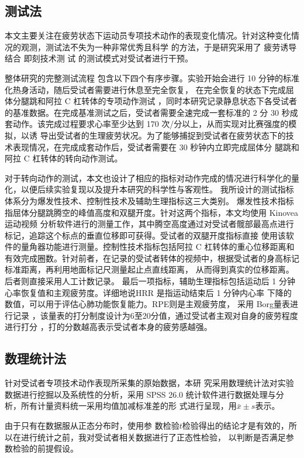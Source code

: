\documentclass[a4paper,12pt]{article}
\begin{document}
\subsection{测试法}

本文主要关注在疲劳状态下运动员专项技术动作的表现变化情况。针对这种变化情况的观测，测试法不失为一种非常优秀且科学
的方法，于是研究采用了 疲劳诱导 结合 即刻技术测
试 的测试模式对受试者进行干预。

整体研究的完整测试流程
包含以下四个有序步骤。实验开始会进行 10 分钟的标准化热身活动，随后受试者需要进行休息至完全恢复，
在完全恢复的状态下完成屈体分腿跳和阿拉 C 杠转体的专项动作测试
，同时本研究记录静息状态下各受试者的基准数据。在完成基准测试之后，受试者需要全速完成一套标准的
2 分 30 秒成套动作。该完成过程要求心率至少达到 170 次/分以上，从而实现对比赛强度的模拟，以诱
导出受试者的生理疲劳状况。为了能够捕捉到受试者在疲劳状态下的技术表现情况，在完成成套动作后，受试者需要在 30 秒钟内立即完成屈体分
腿跳和阿拉 C 杠转体的转向动作测试。

对于转向动作的测试，本文也设计了相应的指标对动作完成的情况进行科学化的量化，以便后续实验复现以及提升本研究的科学性与客观性。
我所设计的测试指标体系分为爆发性技术、控制性技术及辅助生理指标这三大类别。
爆发性技术指标指屈体分腿跳腾空的峰值高度和双腿开度。针对这两个指标，本文均使用 Kinovea 运动视频
分析软件进行的测量工作，其中腾空高度通过对受试者髋部最高点进行标记，追踪这个标点的垂直位移即可获得。受试者的双腿开度指标直接
使用该软件的量角器功能进行测量。控制性技术指标包括阿拉 C 杠转体的重心位移距离和
有效完成圈数。针对前者，在记录的受试者转体的视频中，根据受试者的身高标记标准距离，再利用地面标记尺测量起止点直线距离，
从而得到真实的位移距离。
后者则直接采用人工计数记录。
最后一项指标，辅助生理指标包括运动后 1 分钟心率恢复值和主观疲劳度。详细地说HRR 是指运动结束后 1 分钟内心率
下降的数值，可以用于评估心肺功能恢复能力。RPE则是主观疲劳度， 采用 Borg量表进行记录
，该量表的打分制度设计为6至20分值，通过受试者主观对自身的疲劳程度进行打分
，打的分数越高表示受试者本身的疲劳感越强。

\subsection{数理统计法}

针对受试者专项技术动作表现所采集的原始数据，本研
究采用数理统计法对实验数据进行挖掘以及系统性的分析，采用 SPSS 26.0 统计软件进行数据处理与分析，所有计量资料统一采用均值加减标准差的形
式进行呈现，用$\bar{x}\pm s$表示。

由于只有在数据服从正态分布时，使用参
数检验$t$检验得出的结论才是有效的，所以在进行统计之前，我对受试者相关数据进行了正态性检验，
以判断是否满足参数检验的前提假设。
\end{document}
